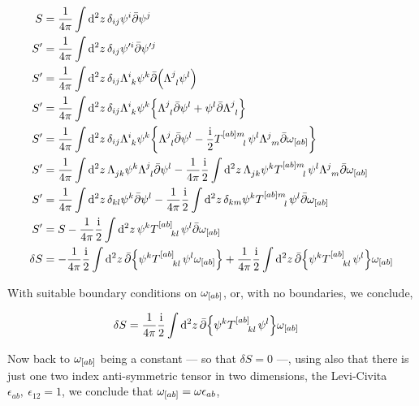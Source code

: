 \begin{align*}
    S&=\frac{1}{4\pi}\int\dd[2]{z}\delta_{ij}\psi^i\bar\partial\psi^j\\
    S'&=\frac{1}{4\pi}\int\dd[2]{z}\delta_{ij}\psi'^i\bar\partial\psi'^j\\
    S'&=\frac{1}{4\pi}\int\dd[2]{z}\delta_{ij}\tensor{\Lambda}{^i_k}\psi^k\bar\partial\qty(\tensor{\Lambda}{^j_l}\psi^l)\\
    S'&=\frac{1}{4\pi}\int\dd[2]{z}\delta_{ij}\tensor{\Lambda}{^i_k}\psi^k\qty{\tensor{\Lambda}{^j_l}\bar\partial\psi^l+\psi^l\bar\partial\tensor{\Lambda}{^j_l}}\\
    S'&=\frac{1}{4\pi}\int\dd[2]{z}\delta_{ij}\tensor{\Lambda}{^i_k}\psi^k\qty{\tensor{\Lambda}{^j_l}\bar\partial\psi^l-\frac\im 2\tensor{T}{^{\qty[ab]}^m_l}\psi^l\tensor{\Lambda}{^j_m}\bar\partial\omega_{\qty[ab]}}\\
    S'&=\frac{1}{4\pi}\int\dd[2]{z}\tensor{\Lambda}{_j_k}\psi^k\tensor{\Lambda}{^j_l}\bar\partial\psi^l-\frac{1}{4\pi}\frac\im 2\int\dd[2]{z}\tensor{\Lambda}{_j_k}\psi^k\tensor{T}{^{\qty[ab]}^m_l}\psi^l\tensor{\Lambda}{^j_m}\bar\partial\omega_{\qty[ab]}\\
    S'&=\frac{1}{4\pi}\int\dd[2]{z}\delta_{kl}\psi^k\bar\partial\psi^l-\frac{1}{4\pi}\frac\im 2\int\dd[2]{z}\delta_{km}\psi^k\tensor{T}{^{\qty[ab]}^m_l}\psi^l\bar\partial\omega_{\qty[ab]}\\
    S'&=S-\frac{1}{4\pi}\frac\im 2\int\dd[2]{z}\psi^k\tensor{T}{^{\qty[ab]}_k_l}\psi^l\bar\partial\omega_{\qty[ab]}\\
    \delta S&=-\frac{1}{4\pi}\frac\im 2\int\dd[2]{z}\bar\partial\qty{\psi^k\tensor{T}{^{\qty[ab]}_k_l}\psi^l\omega_{\qty[ab]}}+\frac{1}{4\pi}\frac\im 2\int\dd[2]{z}\bar\partial\qty{\psi^k\tensor{T}{^{\qty[ab]}_k_l}\psi^l}\omega_{\qty[ab]}
\end{align*}

With suitable boundary conditions on $\omega_{\qty[ab]}$, or, with no boundaries, we conclude,

\begin{align*}
    \delta S&=\frac{1}{4\pi}\frac\im 2\int\dd[2]{z}\bar\partial\qty{\psi^k\tensor{T}{^{\qty[ab]}_k_l}\psi^l}\omega_{\qty[ab]}
\end{align*}

Now back to $\omega_{\qty[ab]}$ being a constant --- so that $\delta S=0$ ---, using also that there is just one two index anti-symmetric tensor in two dimensions, the Levi-Civita $\epsilon_{ab},\ \epsilon_{12}=1$, 
we conclude that $\omega_{\qty[ab]}=\omega\epsilon_{ab}$,

